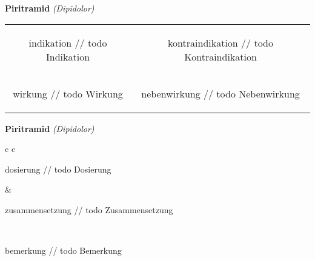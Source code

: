 \documentclass[12pt]{beamer}
\begin{document}
\begin{frame}{
    \textbf{Piritramid}
    \textit{(Dipidolor)}
}
    \begin{tabular}{c c}
        \begin{beamercolorbox}[wd=\boxwidth\textwidth,ht=\boxheight\textheight,sep=1em]{indikation}
        // todo Indikation
        \end{beamercolorbox} & 
        \begin{beamercolorbox}[wd=\boxwidth\textwidth,ht=\boxheight\textheight,sep=1em]{kontraindikation}
        // todo Kontraindikation 
        \end{beamercolorbox} \\
        \begin{beamercolorbox}[wd=\boxwidth\textwidth,ht=\boxheight\textheight,sep=1em]{wirkung}
        // todo Wirkung
        \end{beamercolorbox} & 
        \begin{beamercolorbox}[wd=\boxwidth\textwidth,ht=\boxheight\textheight,sep=1em]{nebenwirkung}
        // todo Nebenwirkung
        \end{beamercolorbox} \\
    \end{tabular}
\end{frame}

\begin{frame}{
    \textbf{Piritramid}
    \textit{(Dipidolor)}
}
    \begin{tabular}{c c}
        \begin{beamercolorbox}[wd=\boxwidth\textwidth,ht=\boxheight\textheight,sep=1em]{dosierung}
        // todo Dosierung
        \end{beamercolorbox} & 
        \begin{beamercolorbox}[wd=\boxwidth\textwidth,ht=\boxheight\textheight,sep=1em]{zusammensetzung}
        // todo Zusammensetzung
        \end{beamercolorbox} \\
        \begin{beamercolorbox}[wd=\textwidth,ht=\boxheight\textheight,sep=1em]{bemerkung}
        // todo Bemerkung
        \end{beamercolorbox} \\
    \end{tabular}
\end{frame}
\end{document}
